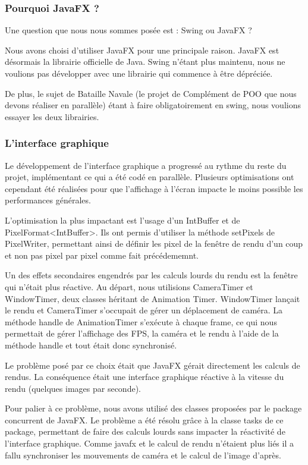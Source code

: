 \subsubsection{Pourquoi JavaFX ?}

Une question que nous nous sommes posée est : Swing ou JavaFX ?

Nous avons choisi d'utiliser JavaFX pour une principale raison. JavaFX est désormais la librairie officielle de Java. Swing n'étant plus maintenu, nous ne voulions pas développer avec une librairie qui commence à être dépréciée.

De plus, le sujet de Bataille Navale (le projet de Complément de POO que nous devons réaliser en parallèle) étant à faire obligatoirement en swing, nous voulions essayer les deux librairies.


\subsubsection{L'interface graphique}

Le développement de l'interface graphique a progressé au rythme du reste du projet, implémentant ce qui a été codé en parallèle. Plusieurs optimisations ont cependant été réalisées pour que l'affichage à l'écran impacte le moins possible les performances générales.

L'optimisation la plus impactant est l'usage d'un IntBuffer et de PixelFormat<IntBuffer>. Ils ont permis d'utiliser la méthode setPixels de PixelWriter, permettant ainsi de définir les pixel de la fenêtre de rendu d'un coup et non pas pixel par pixel comme fait précédememnt.

Un des effets secondaires engendrés par les calculs lourds du rendu est la fenêtre qui n'était plus réactive.
Au départ, nous utilisions CameraTimer et WindowTimer, deux classes héritant de Animation Timer. WindowTimer lançait le rendu et CameraTimer s'occupait de gérer un déplacement de caméra. La méthode handle de AnimationTimer s'exécute à chaque frame, ce qui nous permettait de gérer l'affichage des FPS, la caméra et le rendu à l'aide de la méthode handle et tout était donc synchronisé.

Le problème posé par ce choix était que JavaFX gérait directement les calculs de rendus. La conséquence était une interface graphique réactive à la vitesse du rendu (quelques images par seconde).

\label{UsageTask}

Pour palier à ce problème, nous avons utilisé des classes proposées par le package concurrent de JavaFX. Le problème a été résolu grâce à la classe tasks de ce package, permettant de faire des calculs lourds sans impacter la réactivité de l'interface graphique. Comme javafx et le calcul de rendu n'étaient plus liés il a fallu synchroniser les mouvements de caméra et le calcul de l'image d'après.

